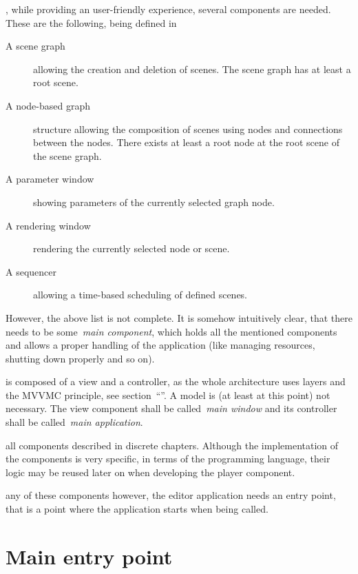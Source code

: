 \documentclass[%
    a4paper,    %
    justified,  %
    nobib,      %
    openany     %
]{tufte-book}
\begin{document}
, while providing an user-friendly
experience, several components are needed. These are the following, being
defined in~~\cite{osterwalder-qde-2016}

\begin{description}
  \item[A scene graph] allowing the creation and deletion of scenes. The scene
    graph has at least a root scene.
  \item[A node-based graph] structure allowing the composition of scenes using
    nodes and connections between the nodes. There exists at least a root node
    at the root scene of the scene graph.
  \item[A parameter window] showing parameters of the currently selected graph
    node.
  \item[A rendering window] rendering the currently selected node or scene.
  \item[A sequencer] allowing a time-based scheduling of defined scenes.
\end{description}

However, the above list is not complete. It is somehow intuitively clear, that
there needs to be some~\emph{main component}, which holds all the mentioned
components and allows a proper handling of the application (like managing
resources, shutting down properly and so on).

 is composed of a view and a controller, as the
whole architecture uses layers and the MVVMC principle, see
section~\enquote{}. A model is (at least at this point) not
necessary. The view component shall be called~\emph{main window} and its
controller shall be called~\emph{main application}.

 all components described in discrete chapters.
Although the implementation of the components is very specific, in terms of the
programming language, their logic may be reused later on when developing the
player component.

 any of these components however, the editor
application needs an entry point, that is a point where the application starts
when being called.

\section{Main entry point}
\label{appendix:sec:editor:main}
\end{document}
